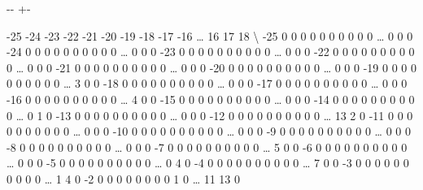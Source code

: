 \documentclass[letterpaper,10pt,english]{sphinxmanual}
\newlength\nbsphinxcodecellspacing
\begin{document}
{

\kern-\sphinxverbatimsmallskipamount\kern-\baselineskip
\kern+\FrameHeightAdjust\kern-\fboxrule
\vspace{\nbsphinxcodecellspacing}

\begin{sphinxVerbatim}[commandchars=\\\{\}]
\llap{\color{nbsphinxout}[126]:\,\hspace{\fboxrule}\hspace{\fboxsep}}     -25  -24  -23  -22  -21  -20  -19  -18  -17  -16  {\ldots}   16   17   18  \textbackslash{}
-25    0    0    0    0    0    0    0    0    0    0  {\ldots}    0    0    0
-24    0    0    0    0    0    0    0    0    0    0  {\ldots}    0    0    0
-23    0    0    0    0    0    0    0    0    0    0  {\ldots}    0    0    0
-22    0    0    0    0    0    0    0    0    0    0  {\ldots}    0    0    0
-21    0    0    0    0    0    0    0    0    0    0  {\ldots}    0    0    0
-20    0    0    0    0    0    0    0    0    0    0  {\ldots}    0    0    0
-19    0    0    0    0    0    0    0    0    0    0  {\ldots}    3    0    0
-18    0    0    0    0    0    0    0    0    0    0  {\ldots}    0    0    0
-17    0    0    0    0    0    0    0    0    0    0  {\ldots}    0    0    0
-16    0    0    0    0    0    0    0    0    0    0  {\ldots}    4    0    0
-15    0    0    0    0    0    0    0    0    0    0  {\ldots}    0    0    0
-14    0    0    0    0    0    0    0    0    0    0  {\ldots}    0    1    0
-13    0    0    0    0    0    0    0    0    0    0  {\ldots}    0    0    0
-12    0    0    0    0    0    0    0    0    0    0  {\ldots}   13    2    0
-11    0    0    0    0    0    0    0    0    0    0  {\ldots}    0    0    0
-10    0    0    0    0    0    0    0    0    0    0  {\ldots}    0    0    0
-9     0    0    0    0    0    0    0    0    0    0  {\ldots}    0    0    0
-8     0    0    0    0    0    0    0    0    0    0  {\ldots}    0    0    0
-7     0    0    0    0    0    0    0    0    0    0  {\ldots}    5    0    0
-6     0    0    0    0    0    0    0    0    0    0  {\ldots}    0    0    0
-5     0    0    0    0    0    0    0    0    0    0  {\ldots}    0    4    0
-4     0    0    0    0    0    0    0    0    0    0  {\ldots}    7    0    0
-3     0    0    0    0    0    0    0    0    0    0  {\ldots}    1    4    0
-2     0    0    0    0    0    0    0    0    1    0  {\ldots}   11   13    0

\end{sphinxVerbatim}}
\end{document}
